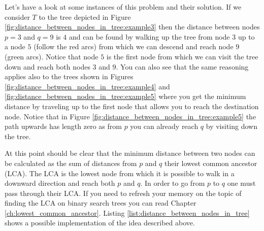 Let's have a look at some instances of this problem and their solution. If we consider $T$ to the
tree depicted in Figure \ref{fig:distance_between_nodes_in_tree:example3} then the distance between
nodes $p=3$ and $q=9$ is $4$ and  
can be found by walking up the tree from node $3$ up to a node $5$ (follow the red arcs) from which
we can descend and reach  node $9$ (green arcs). Notice that node $5$ is the first node from which
we can visit the tree down and reach both nodes $3$ and $9$. You can also see that the same
reasoning applies also to the trees shown in Figures
\ref{fig:distance_between_nodes_in_tree:example4} and
\ref{fig:distance_between_nodes_in_tree:example5} where you get the minimum distance by traveling up
to the first node that allows you to reach the destination node. Notice that in Figure
\ref{fig:distance_between_nodes_in_tree:example5} the path upwards has length zero as from $p$ you
can already reach $q$ by visiting down the tree.

At this point should be clear that the minimum distance between two nodes can be calculated as the
sum of distances from $p$ and $q$ their lowest common ancestor (LCA). The LCA is the lowest node
from which it is possible to walk in a downward direction and reach both $p$ and $q$. In order to go
from $p$ to $q$ one must pass through their LCA. If you need to refresh your memory on the topic of
finding the LCA on binary search trees you can read Chapter \ref{ch:lowest_common_ancestor}. Listing
\ref{list:distance_between_nodes_in_tree} shows a possible implementation of the idea described
above. 

